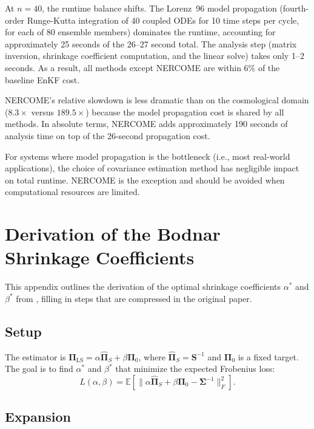At $n = 40$, the runtime balance shifts. The Lorenz~96 model propagation (fourth-order Runge-Kutta integration of 40 coupled ODEs for 10 time steps per cycle, for each of 80 ensemble members) dominates the runtime, accounting for approximately 25 seconds of the 26--27 second total. The analysis step (matrix inversion, shrinkage coefficient computation, and the linear solve) takes only 1--2 seconds. As a result, all methods except NERCOME are within 6\% of the baseline EnKF cost.

NERCOME's relative slowdown is less dramatic than on the cosmological domain ($8.3\times$ versus $189.5\times$) because the model propagation cost is shared by all methods. In absolute terms, NERCOME adds approximately 190 seconds of analysis time on top of the 26-second propagation cost.

For systems where model propagation is the bottleneck (i.e., most real-world applications), the choice of covariance estimation method has negligible impact on total runtime. NERCOME is the exception and should be avoided when computational resources are limited.

\chapter{Derivation of the Bodnar Shrinkage Coefficients}
\label{app:bodnar_derivation}

This appendix outlines the derivation of the optimal shrinkage coefficients $\alpha^*$ and $\beta^*$ from \citep{bodnar2016direct}, filling in steps that are compressed in the original paper.

\section{Setup}

The estimator is $\boldsymbol{\Pi}_{\text{LS}} = \alpha \hat{\boldsymbol{\Pi}}_S + \beta \boldsymbol{\Pi}_0$, where $\hat{\boldsymbol{\Pi}}_S = \mathbf{S}^{-1}$ and $\boldsymbol{\Pi}_0$ is a fixed target. The goal is to find $\alpha^*$ and $\beta^*$ that minimize the expected Frobenius loss:
\begin{equation}
\label{eq:app_loss}
L(\alpha, \beta) = \mathbb{E}\left[\|\alpha \hat{\boldsymbol{\Pi}}_S + \beta \boldsymbol{\Pi}_0 - \boldsymbol{\Sigma}^{-1}\|_F^2\right].
\end{equation}

\section{Expansion}

